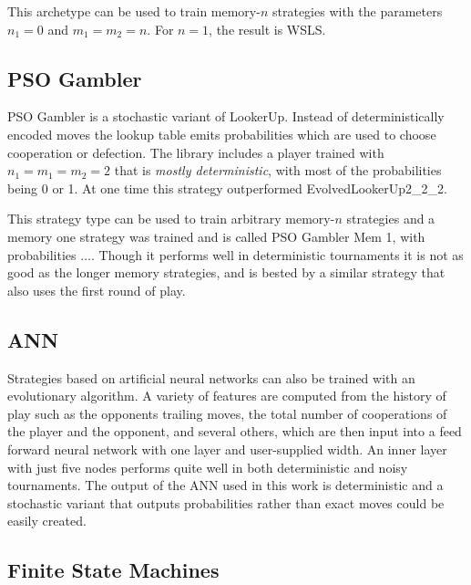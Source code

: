 \documentclass{article}
\begin{document}

This archetype can be used to train memory-$n$ strategies with the parameters
$n_1=0$ and $m_1=m_2=n$. For $n=1$, the result is WSLS.


\subsection{PSO Gambler}

PSO Gambler is a stochastic variant of LookerUp. Instead of deterministically
encoded moves the lookup table emits probabilities which are
used to choose cooperation or defection. The library includes a player trained
with $n_1 = m_1 = m_2 = 2$ that is \emph{mostly deterministic}, with most of the
probabilities being 0 or 1. At one time this strategy outperformed
EvolvedLookerUp2_2_2.


This strategy type can be used to train arbitrary memory-$n$ strategies and a
memory one strategy was trained and is called PSO Gambler Mem 1, with
probabilities $\ldots$. Though it performs well in deterministic tournaments
it is not as good as the longer memory strategies, and is bested by a similar
strategy that also uses the first round of play.


\subsection{ANN}

Strategies based on artificial neural networks can also be trained with an
evolutionary algorithm. A variety of features are computed from the history
of play such as the opponents trailing moves, the total number of cooperations
of the player and the opponent, and several others, which are then input
into a feed forward neural network with one layer and user-supplied width.
An inner layer with just five nodes performs quite well in both deterministic and
noisy tournaments. The output of the ANN used in this work is deterministic and
a stochastic variant that outputs probabilities rather than exact moves could
be easily created.



\subsection{Finite State Machines}
\end{document}
